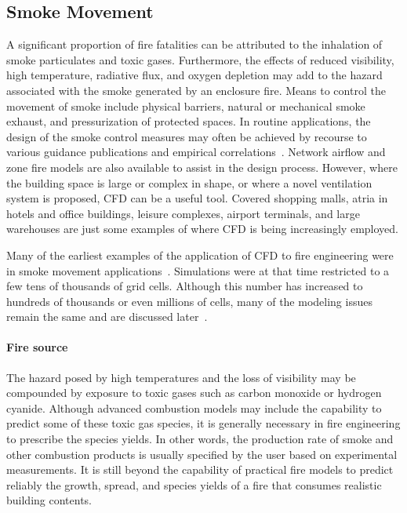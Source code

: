 \documentclass[graybox]{svmult}
\begin{document}
\subsection{Smoke Movement}

A significant proportion of fire fatalities can be attributed to the inhalation of smoke particulates and toxic gases. Furthermore, the effects of reduced visibility, high temperature, radiative flux, and oxygen depletion may add to the hazard associated with the smoke generated by an enclosure fire. Means to control the movement of smoke include physical barriers, natural or mechanical smoke exhaust, and pressurization of protected spaces. In routine applications, the design of the smoke control measures may often be achieved by recourse to various guidance publications and empirical correlations~\cite{Klote, NFPA:92B}. Network airflow and zone fire models are also available to assist in the design process. However, where the building space is large or complex in shape, or where a novel ventilation system is proposed, CFD can be a useful tool. Covered shopping malls, atria in hotels and office buildings, leisure complexes, airport terminals, and large warehouses are just some examples of where CFD is being increasingly employed.

Many  of  the  earliest  examples  of  the  application of CFD to fire engineering were in smoke movement applications~\cite{Pericleous, Cox:1990}. Simulations were at that time restricted to a few tens of thousands of grid cells. Although this number has increased to hundreds of thousands or even millions of cells, many of the modeling issues remain the same and are discussed later~\cite{Kumar}.

\paragraph{Fire source}

The hazard posed by high temperatures and the loss of visibility may be compounded by exposure to toxic gases such as carbon monoxide or hydrogen cyanide. Although advanced combustion models may include the capability to predict some of these toxic gas species, it is generally necessary in fire engineering to prescribe the species yields. In other words, the production rate of smoke and other combustion products is usually specified by the user based on experimental measurements. It is still beyond the capability of practical fire models to predict reliably the growth, spread, and species yields of a fire that consumes realistic building contents.
\end{document}
